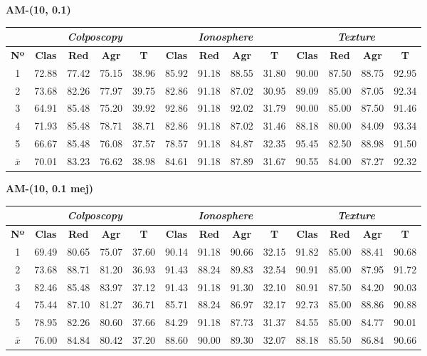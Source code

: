 \documentclass[12pt]{article}
\begin{document}
\textbf{AM-(10, 0.1)}

\begin{table}[ht!]
\begin{tabular}{ccccc|cccc|cccc}
\centering
 & \multicolumn{4}{c}{\textit{Colposcopy}} & \multicolumn{4}{c}{\textit{Ionosphere}} & \multicolumn{4}{c}{\textit{Texture}} \\ \hline
\textbf{Nº} & \textbf{Clas} & \textbf{Red} & \textbf{Agr} & \textbf{T} & \textbf{Clas} & \textbf{Red} & \textbf{Agr} & \textbf{T} & \textbf{Clas} & \textbf{Red} & \textbf{Agr} & \textbf{T} \\ \hline
1 & 72.88 & 77.42 & 75.15 & 38.96 & 85.92 & 91.18 & 88.55 & 31.80 & 90.00 & 87.50 & 88.75 & 92.95 \\
2 & 73.68 & 82.26 & 77.97 & 39.75 & 82.86 & 91.18 & 87.02 & 30.95 & 89.09 & 85.00 & 87.05 & 92.34 \\
3 & 64.91 & 85.48 & 75.20 & 39.92 & 92.86 & 91.18 & 92.02 & 31.79 & 90.00 & 85.00 & 87.50 & 91.46 \\
4 & 71.93 & 85.48 & 78.71 & 38.71 & 82.86 & 91.18 & 87.02 & 31.46 & 88.18 & 80.00 & 84.09 & 93.34 \\
5 & 66.67 & 85.48 & 76.08 & 37.57 & 78.57 & 91.18 & 84.87 & 32.35 & 95.45 & 82.50 & 88.98 & 91.50 \\
\hline
$\bar{x}$ & 70.01 & 83.23 & 76.62 & 38.98 & 84.61 & 91.18 & 87.89 & 31.67 & 90.55 & 84.00 & 87.27 & 92.32 \\
\end{tabular}
\end{table}
\newpage

\textbf{AM-(10, 0.1 mej)}


\begin{table}[ht!]
\begin{tabular}{ccccc|cccc|cccc}
\centering
 & \multicolumn{4}{c}{\textit{Colposcopy}} & \multicolumn{4}{c}{\textit{Ionosphere}} & \multicolumn{4}{c}{\textit{Texture}} \\ \hline
\textbf{Nº} & \textbf{Clas} & \textbf{Red} & \textbf{Agr} & \textbf{T} & \textbf{Clas} & \textbf{Red} & \textbf{Agr} & \textbf{T} & \textbf{Clas} & \textbf{Red} & \textbf{Agr} & \textbf{T} \\ \hline
1 & 69.49 & 80.65 & 75.07 & 37.60 & 90.14 & 91.18 & 90.66 & 32.15 & 91.82 & 85.00 & 88.41 & 90.68 \\
2 & 73.68 & 88.71 & 81.20 & 36.93 & 91.43 & 88.24 & 89.83 & 32.54 & 90.91 & 85.00 & 87.95 & 91.72 \\
3 & 82.46 & 85.48 & 83.97 & 37.12 & 91.43 & 91.18 & 91.30 & 32.10 & 80.91 & 87.50 & 84.20 & 90.03 \\
4 & 75.44 & 87.10 & 81.27 & 36.71 & 85.71 & 88.24 & 86.97 & 32.17 & 92.73 & 85.00 & 88.86 & 90.88 \\
5 & 78.95 & 82.26 & 80.60 & 37.66 & 84.29 & 91.18 & 87.73 & 31.37 & 84.55 & 85.00 & 84.77 & 90.01 \\
\hline
$\bar{x}$ & 76.00 & 84.84 & 80.42 & 37.20 & 88.60 & 90.00 & 89.30 & 32.07 & 88.18 & 85.50 & 86.84 & 90.66 \\
\end{tabular}
\end{table}
\end{document}
